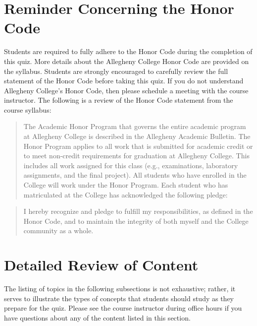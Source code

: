 \documentclass[11pt]{article}
\begin{document}
\section*{Reminder Concerning the Honor Code}

\noindent Students are required to fully adhere to the Honor Code during the
completion of this quiz. More details about the Allegheny College Honor Code are
provided on the syllabus. Students are strongly encouraged to carefully review
the full statement of the Honor Code before taking this quiz. If you do not
understand Allegheny College's Honor Code, then please schedule a meeting with
the course instructor. The following is a review of the Honor Code statement
from the course syllabus:

\begin{quote}
The Academic Honor Program that governs the entire academic program at
Allegheny College is described in the Allegheny Academic Bulletin. The Honor
Program applies to all work that is submitted for academic credit or to meet
non-credit requirements for graduation at Allegheny College. This includes all
work assigned for this class (e.g., examinations, laboratory assignments, and
the final project). All students who have enrolled in the College will work
under the Honor Program. Each student who has matriculated at the College has
acknowledged the following pledge:
\end{quote}

\vspace*{-.15in}

\begin{quote}
  I hereby recognize and pledge to fulfill my responsibilities, as defined in
  the Honor Code, and to maintain the integrity of both myself and the College
  community as a whole.
\end{quote}

\section*{Detailed Review of Content}

The listing of topics in the following subsections is not exhaustive; rather,
it serves to illustrate the types of concepts that students should study as
they prepare for the quiz. Please see the course instructor during office hours
if you have questions about any of the content listed in this section.

\vspace*{-.15in}
\end{document}
